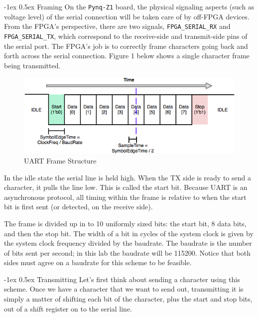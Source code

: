 \documentclass[11pt]{article}
\makeatletter
\renewcommand{\subsection}
{\@startsection {subsection}{1}{0pt}
 {-1ex}
 {0.5ex}
 {\bfseries\normalsize}}
\makeatother
\begin{document}
\subsection{Framing}
On the \verb|Pynq-Z1| board, the physical signaling aspects (such as voltage level) of the serial connection will be taken care of by off-FPGA devices.
From the FPGA's perspective, there are two signals, \verb|FPGA_SERIAL_RX| and \verb|FPGA_SERIAL_TX|, which correspond to the receive-side and transmit-side pins of the serial port.
The FPGA's job is to correctly frame characters going back and forth across the serial connection.
Figure 1 below shows a single character frame being transmitted.

\begin{figure}[H]
  \centerline{\includegraphics[width=6in]{figs/uart_frame.png}}
  \caption{UART Frame Structure}
\end{figure}

In the idle state the serial line is held high.
When the TX side is ready to send a character, it pulls the line low.
This is called the start bit.
Because UART is an asynchronous protocol, all timing within the frame is relative to when the start bit is first sent (or detected, on the receive side).

The frame is divided up in to 10 uniformly sized bits: the start bit, 8 data bits, and then the stop bit.
The width of a bit in cycles of the system clock is given by the system clock frequency divided by the baudrate.
The baudrate is the number of bits sent per second; in this lab the baudrate will be 115200.
Notice that both sides must agree on a baudrate for this scheme to be feasible.

\subsection{Transmitting}
Let's first think about sending a character using this scheme.
Once we have a character that we want to send out, transmitting it is simply a matter of shifting each bit of the character, plus the start and stop bits, out of a shift register on to the serial line.
\end{document}
